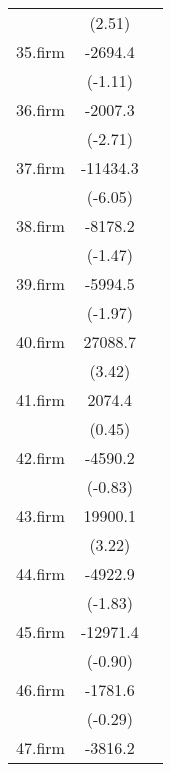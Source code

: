 {\begin{tabular}{l*{2}{c}}
            &      (2.51)         &                     \\
[1em]
35.firm     &     -2694.4         &                     \\
            &     (-1.11)         &                     \\
[1em]
36.firm     &     -2007.3\sym{**} &                     \\
            &     (-2.71)         &                     \\
[1em]
37.firm     &    -11434.3\sym{***}&                     \\
            &     (-6.05)         &                     \\
[1em]
38.firm     &     -8178.2         &                     \\
            &     (-1.47)         &                     \\
[1em]
39.firm     &     -5994.5\sym{*}  &                     \\
            &     (-1.97)         &                     \\
[1em]
40.firm     &     27088.7\sym{***}&                     \\
            &      (3.42)         &                     \\
[1em]
41.firm     &      2074.4         &                     \\
            &      (0.45)         &                     \\
[1em]
42.firm     &     -4590.2         &                     \\
            &     (-0.83)         &                     \\
[1em]
43.firm     &     19900.1\sym{**} &                     \\
            &      (3.22)         &                     \\
[1em]
44.firm     &     -4922.9         &                     \\
            &     (-1.83)         &                     \\
[1em]
45.firm     &    -12971.4         &                     \\
            &     (-0.90)         &                     \\
[1em]
46.firm     &     -1781.6         &                     \\
            &     (-0.29)         &                     \\
[1em]
47.firm     &     -3816.2         &                     \\

\end{tabular}}
